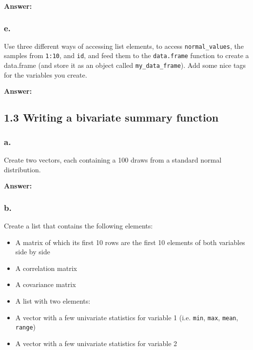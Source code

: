 \documentclass[]{article}
\providecommand{\tightlist}{%
  \setlength{\itemsep}{0pt}\setlength{\parskip}{0pt}}
\begin{document}
\textbf{Answer:}

\hypertarget{e.}{%
\subsubsection{e.}\label{e.}}

Use three different ways of accessing list elements, to access
\texttt{normal\_values}, the samples from \texttt{1:10}, and
\texttt{id}, and feed them to the \texttt{data.frame} function to create
a data.frame (and store it as an object called
\texttt{my\_data\_frame}). Add some nice tags for the variables you
create.

\textbf{Answer:}

\hypertarget{writing-a-bivariate-summary-function}{%
\subsection{1.3 Writing a bivariate summary
function}\label{writing-a-bivariate-summary-function}}

\hypertarget{a.-1}{%
\subsubsection{a.}\label{a.-1}}

Create two vectors, each containing a 100 draws from a standard normal
distribution.

\textbf{Answer:}

\hypertarget{b.-1}{%
\subsubsection{b.}\label{b.-1}}

Create a list that contains the following elements:

\begin{itemize}
\tightlist
\item
  A matrix of which its first 10 rows are the first 10 elements of both
  variables side by side\\
\item
  A correlation matrix\\
\item
  A covariance matrix\\
\item
  A list with two elements:\\
\item
  A vector with a few univariate statistics for variable 1 (i.e.
  \texttt{min}, \texttt{max}, \texttt{mean}, \texttt{range})\\
\item
  A vector with a few univariate statistics for variable 2
\end{itemize}
\end{document}
